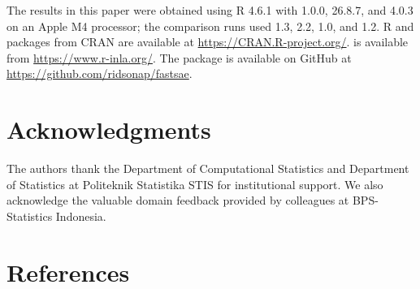 The  results in this paper were obtained using R 4.6.1 with  1.0.0,  26.8.7, and  4.0.3 on an Apple M4 processor; the comparison runs used  1.3,  2.2,  1.0, and  1.2. R and packages from CRAN are available at \url{https://CRAN.R-project.org/}.  is available from \url{https://www.r-inla.org/}. The  package is available on GitHub at \url{https://github.com/ridsonap/fastsae}.

\section*{Acknowledgments}

The authors thank the Department of Computational Statistics and Department of Statistics at Politeknik Statistika STIS for institutional support. We also acknowledge the valuable domain feedback provided by colleagues at BPS-Statistics Indonesia.

\section*{References}



\address{%
Ridson Al Farizal P.\\
Department of Computational Statistics, Politeknik Statistika STIS\\%
Jl. Otto Iskandardinata No.~64C\\ Jakarta Timur 13330, Indonesia\\
%
%
\textit{ORCiD: \href{https://orcid.org/0000-0003-0617-0214}{0000-0003-0617-0214}}\\%
\href{mailto:alfrzlp@gmail.com}{\nolinkurl{alfrzlp@gmail.com}}%
}

\address{%
Azka Ubaidillah\\
Department of Statistics, Politeknik Statistika STIS\\%
Jl. Otto Iskandardinata No.~64C\\ Jakarta Timur 13330, Indonesia\\
%
%
\textit{ORCiD: \href{https://orcid.org/0000-0002-3597-0459}{0000-0002-3597-0459}}\\%
\href{mailto:azka@stis.ac.id}{\nolinkurl{azka@stis.ac.id}}%
}
